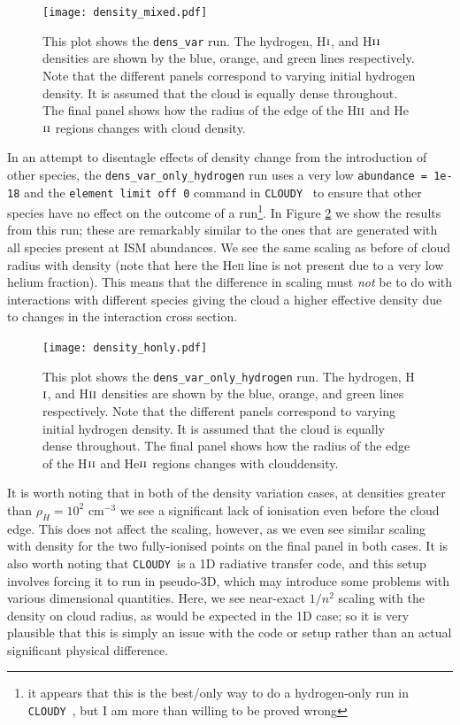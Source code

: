 \documentclass[a4paper]{article}
\newcommand{\cloudy}{{\tt CLOUDY}~}
\begin{document}
\begin{figure}[!h]
\centering
\texttt{[image: density\_mixed.pdf]}
    \caption{This plot shows the {\tt dens\_var} run.
    The hydrogen, H$\textsc{i}$, and H$\textsc{ii}$ densities
are shown by the blue, orange, and green lines respectively. Note that
the different panels correspond to varying initial hydrogen density. It
is assumed that the cloud is equally dense throughout. The final panel
shows how the radius of the edge of the H$\textsc{ii}$ and
He$\textsc{ii}$ regions changes with cloud
density.}\label{fig:density}
\end{figure}
In an attempt to disentagle effects of density change from the introduction
of other species, the {\tt dens\_var\_only\_hydrogen} run uses a very low
{\tt abundance = 1e-18} and the {\tt element limit off 0} command in \cloudy
to ensure that other species have no effect on the outcome of a run\footnote{
    it appears that this is the best/only way to do a hydrogen-only run in 
    \cloudy, but I am more than willing to be proved wrong}.
In Figure \ref{fig:densityhonly} we show the results from this run; these
are remarkably similar to the ones that are generated with all species present
at ISM abundances. We see the same scaling as before of cloud radius with
density (note that here the He\textsc{ii} line is not present due to a very
low helium fraction). This means that the difference in scaling must \emph{not}
be to do with interactions with different species giving the cloud a higher 
effective density due to changes in the interaction cross section.

\begin{figure}[!h]
\centering
\texttt{[image: density\_honly.pdf]}
    \caption{This plot shows the {\tt dens\_var\_only\_hydrogen} run.
        The hydrogen, H$\textsc{i}$, and H$\textsc{ii}$ densities are shown by
        the blue, orange, and green lines respectively. Note that the different
        panels correspond to varying initial hydrogen density. It is assumed
        that the cloud is equally dense throughout. The final panel shows how
        the radius of the edge of the H$\textsc{ii}$ and He$\textsc{ii}$
        regions changes with clouddensity.}
    \label{fig:densityhonly}
\end{figure}
It is worth noting that in both of the density variation cases, at densities
greater than $\rho_H = 10^2$ cm$^{-3}$ we see a significant lack of ionisation
even before the cloud edge. This does not affect the scaling, however, as 
we even see similar scaling with density for the two fully-ionised points on
the final panel in both cases. It is also worth noting that \cloudy is a 1D
radiative transfer code, and this setup involves forcing it to run in pseudo-3D,
which may introduce some problems with various dimensional quantities. Here,
we see near-exact $1/n^2$ scaling with the density on cloud radius, as would
be expected in the 1D case; so it is very plausible that this is simply an
issue with the code or setup rather than an actual significant physical
difference.
\end{document}
